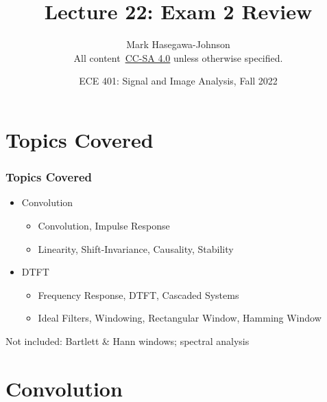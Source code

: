 \documentclass{beamer}
\title{Lecture 22: Exam 2 Review}
\author{Mark Hasegawa-Johnson\\All content~\href{https://creativecommons.org/licenses/by-sa/4.0/}{CC-SA 4.0} unless otherwise specified.}
\date{ECE 401: Signal and Image Analysis, Fall 2022}
\begin{document}
\begin{frame}
  \maketitle
\end{frame}

\begin{frame}
  \tableofcontents
\end{frame}

\section[Topics]{Topics Covered}
\setcounter{subsection}{1}

\begin{frame}
  \frametitle{Topics Covered}

  \begin{itemize}
  \item Convolution
    \begin{itemize}
    \item Convolution, Impulse Response
    \item Linearity, Shift-Invariance, Causality, Stability
    \end{itemize}
  \item DTFT
    \begin{itemize}
    \item Frequency Response, DTFT, Cascaded Systems
    \item Ideal Filters, Windowing, Rectangular Window, Hamming Window
    \end{itemize}
  \end{itemize}
  Not included: Bartlett \& Hann windows; spectral analysis
\end{frame}

\section[Convolution]{Convolution}
\setcounter{subsection}{1}
\end{document}
